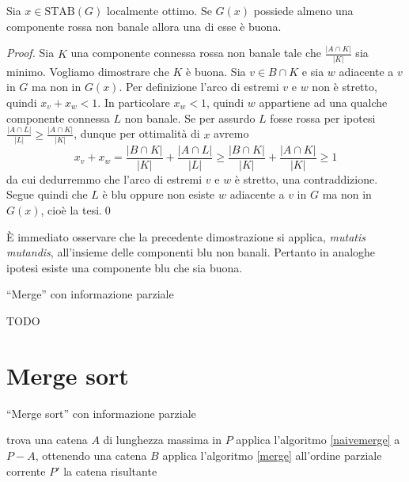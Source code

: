 \begin{lemma}
	\label{goodlemma} Sia \(x\in \text{STAB}(G)\) localmente ottimo. Se \(G(x)\) possiede almeno una componente rossa non banale allora una di esse è buona. 
\end{lemma}
\begin{proof}
	Sia \(K\) una componente connessa rossa non banale tale che \(\frac{|A\cap K|}{|K|}\) sia minimo. Vogliamo dimostrare che \(K\) è buona. Sia \(v\in B\cap K\) e sia \(w\) adiacente a \(v\) in \(G\) ma non in \(G(x)\). Per definizione l'arco di estremi \(v\) e \(w\) non è stretto, quindi \(x_v+x_w<1\). In particolare \(x_w<1\), quindi \(w\) appartiene ad una qualche componente connessa \(L\) non banale. Se per assurdo \(L\) fosse rossa per ipotesi \(\frac{|A\cap L|}{|L|}\ge\frac{|A\cap K|}{|K|}\), dunque per ottimalità di \(x\) avremo
	\[x_v+x_w=\frac{|B\cap K|}{|K|}+\frac{|A\cap L|}{|L|}\ge\frac{|B\cap K|}{|K|}+\frac{|A\cap K|}{|K|}\ge 1\]
	da cui dedurremmo che l'arco di estremi \(v\) e \(w\) è stretto, una contraddizione. Segue quindi che \(L\) è blu oppure non esiste \(w\) adiacente a \(v\) in \(G\) ma non in \(G(x)\), cioè la tesi.\qed 
\end{proof}
È immediato osservare che la precedente dimostrazione si applica, \emph{mutatis mutandis}, all'insieme delle componenti blu non banali. Pertanto in analoghe ipotesi esiste una componente blu che sia buona.

\begin{algorithm}
  \caption{``Merge'' con informazione parziale} \label{merge}
	\begin{algorithmic}
	  \STATE TODO
	\end{algorithmic}
\end{algorithm}

\section{Merge sort} 
\begin{algorithm}
  \caption{``Merge sort'' con informazione parziale} \label{mergesort}
	\begin{algorithmic}
		\STATE trova una catena \(A\) di lunghezza massima in \(P\)
		\STATE applica l'algoritmo \ref{naivemerge} a \(P-A\), ottenendo una catena \(B\)
		\STATE applica l'algoritmo \ref{merge} all'ordine parziale corrente \(P'\)
		\RETURN la catena risultante
	\end{algorithmic}
\end{algorithm}